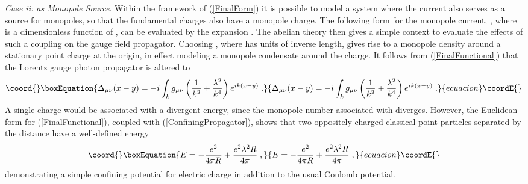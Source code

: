 \documentclass[a4paper,a4paper]{article}
\begin{document}
{\it Case ii: \myHighlight{$\jmath$}\coordHE{} as Monopole Source}.  Within the framework of (\ref{FinalForm}) it is possible to model a system where the current \myHighlight{$\jmath$}\coordHE{} also serves as a source for monopoles, so that the fundamental charges also have a monopole charge. The following form for the monopole current, \coordHE{}, where \coordHE{} is a dimensionless function of \coordHE{}, can be evaluated by the expansion \coordHE{}.   The abelian theory then gives a simple context to evaluate the effects of such a coupling on the gauge field propagator.  Choosing \coordHE{}, where \myHighlight{$\lambda$}\coordHE{} has units of inverse length, gives rise to a monopole density \coordHE{} around a stationary point charge \coordHE{} at the origin, in effect modeling a monopole condensate around the charge.  It follows from (\ref{FinalFunctional}) that the Lorentz gauge photon propagator is altered to 
\begin{equation}\coord{}\boxEquation{
\label{ConfiningPropagator}
\Delta_{\mu \nu} (x - y)  = - i \int_k g_{\mu \nu} \left( \frac{1}{k^2} + \frac{\lambda^2}{k^4}  \right) e^{ik ( x - y ) } \;.
}{
\Delta_{\mu \nu} (x - y)  = - i \int_k g_{\mu \nu} \left( \frac{1}{k^2} + \frac{\lambda^2}{k^4}  \right) e^{ik ( x - y ) } \;.
}{ecuacion}\coordE{}\end{equation}
A single charge would be associated with a divergent energy, since the monopole number associated with \coordHE{} diverges. However, the Euclidean form for (\ref{FinalFunctional}), coupled with (\ref{ConfiningPropagator}), shows that two oppositely charged classical point particles separated by the distance \coordHE{} have a well-defined energy  
\begin{equation}\coord{}\boxEquation{
\label{ConfiningPotential}
E = - \frac{e^2}{4 \pi R} + \frac{e^2 \lambda^2 R}{4 \pi} \; ,
}{
E = - \frac{e^2}{4 \pi R} + \frac{e^2 \lambda^2 R}{4 \pi} \; ,
}{ecuacion}\coordE{}\end{equation}
demonstrating a simple confining potential for electric charge in addition to the usual Coulomb potential. 
\end{document}
